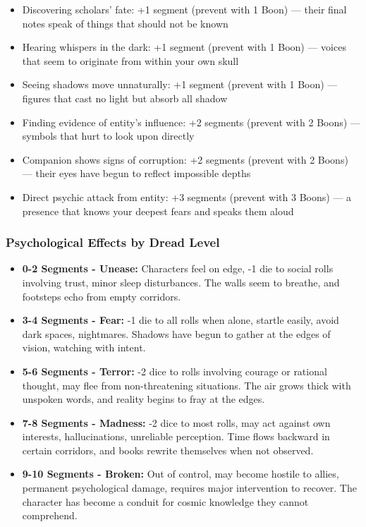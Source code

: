 \documentclass[11pt]{article}
\begin{document}
\begin{itemize}
\item Discovering scholars' fate: +1 segment (prevent with 1 Boon) --- their final notes speak of things that should not be known
\item Hearing whispers in the dark: +1 segment (prevent with 1 Boon) --- voices that seem to originate from within your own skull
\item Seeing shadows move unnaturally: +1 segment (prevent with 1 Boon) --- figures that cast no light but absorb all shadow
\item Finding evidence of entity's influence: +2 segments (prevent with 2 Boons) --- symbols that hurt to look upon directly
\item Companion shows signs of corruption: +2 segments (prevent with 2 Boons) --- their eyes have begun to reflect impossible depths
\item Direct psychic attack from entity: +3 segments (prevent with 3 Boons) --- a presence that knows your deepest fears and speaks them aloud
\end{itemize}

\subsubsection{Psychological Effects by Dread Level}

\begin{itemize}
\item \textbf{0-2 Segments - Unease:} Characters feel on edge, -1 die to social rolls involving trust, minor sleep disturbances. The walls seem to breathe, and footsteps echo from empty corridors.
\item \textbf{3-4 Segments - Fear:} -1 die to all rolls when alone, startle easily, avoid dark spaces, nightmares. Shadows have begun to gather at the edges of vision, watching with intent.
\item \textbf{5-6 Segments - Terror:} -2 dice to rolls involving courage or rational thought, may flee from non-threatening situations. The air grows thick with unspoken words, and reality begins to fray at the edges.
\item \textbf{7-8 Segments - Madness:} -2 dice to most rolls, may act against own interests, hallucinations, unreliable perception. Time flows backward in certain corridors, and books rewrite themselves when not observed.
\item \textbf{9-10 Segments - Broken:} Out of control, may become hostile to allies, permanent psychological damage, requires major intervention to recover. The character has become a conduit for cosmic knowledge they cannot comprehend.
\end{itemize}
\end{document}
